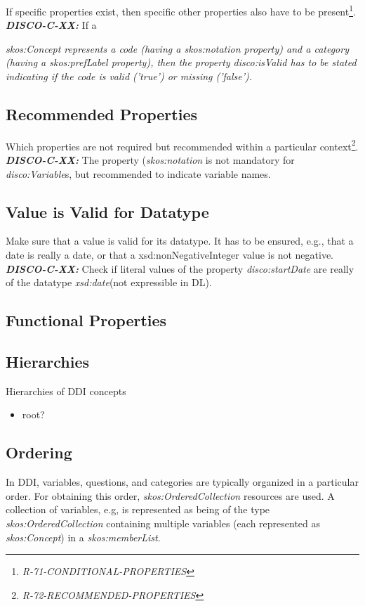 \documentclass{llncs}
\begin{document}
If specific properties exist, then specific other properties also have to be present\footnote{{\em R-71-CONDITIONAL-PROPERTIES}}.
\textbf{{\em DISCO-C-XX:}}
If a {\em skos:Concept represents a code (having a {\em skos:notation} property) and a category (having a {\em skos:prefLabel} property), 
then the property {\em disco:isValid} has to be stated indicating if the code is valid ('true') or missing ('false').

\subsection{Recommended Properties}

Which properties are not required but recommended within a particular context\footnote{{\em R-72-RECOMMENDED-PROPERTIES}}.
\textbf{{\em DISCO-C-XX:}}
The property ({\em skos:notation} is not mandatory for {\em disco:Variable}s, but recommended to indicate variable names.

\subsection{Value is Valid for Datatype}

Make sure that a value is valid for its datatype.
It has to be ensured, e.g., that a date is really a date, or that a xsd:nonNegativeInteger value is not negative. 
\textbf{{\em DISCO-C-XX:}}
Check if literal values of the property {\em disco:startDate} are really of the datatype {\em xsd:date}(not expressible in DL).

\subsection{Functional Properties}

\subsection{Hierarchies}

Hierarchies of DDI concepts

\begin{itemize}
	\item root?
\end{itemize}

\subsection{Ordering}

In DDI, variables, questions, and categories are typically organized in a particular order. 
For obtaining this order, {\em skos:OrderedCollection} resources are used. 
A collection of variables, e.g, is represented as being of the type {\em skos:OrderedCollection} containing multiple variables (each represented as {\em skos:Concept}) in a {\em skos:memberList}. 

}
\end{document}
